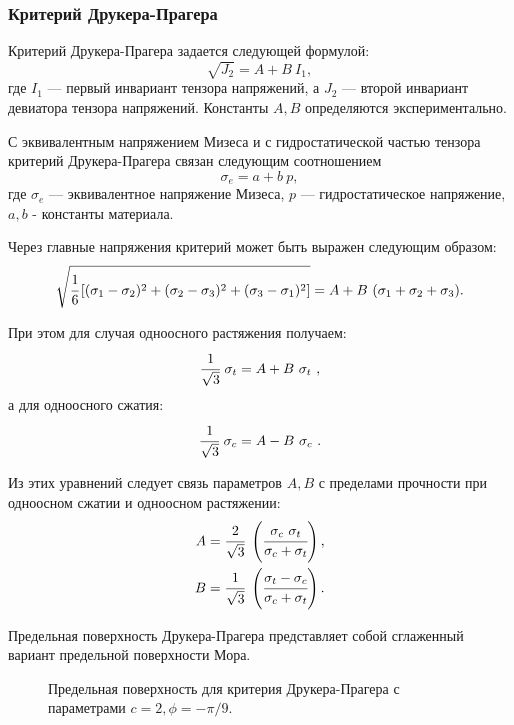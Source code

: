 \subsubsection{Критерий Друкера-Прагера}

Критерий Друкера-Прагера задается следующей формулой:
\begin{equation}
\sqrt{J_2} = A + B~I_1,
\end{equation}
где $I_1$ — первый инвариант тензора напряжений, а $J_2$ — второй инвариант девиатора тензора напряжений. Константы $A, B$ определяются экспериментально.

С эквивалентным напряжением Мизеса и с гидростатической частью тензора критерий Друкера-Прагера связан следующим соотношением
\begin{equation}
\sigma_e = a + b~p,
\end{equation}
где $\sigma_e$ — эквивалентное напряжение Мизеса, $p$ — гидростатическое напряжение, $a,b$ - константы материала.

Через главные напряжения критерий может быть выражен следующим образом:
\begin{equation}
\sqrt{\cfrac{1}{6}\left[(\sigma_1-\sigma_2)^2+(\sigma_2-\sigma_3)^2+(\sigma_3-\sigma_1)^2\right]} = A + B~(\sigma_1+\sigma_2+\sigma_3).
\end{equation}

При этом для случая одноосного растяжения получаем:
\begin{equation}
\cfrac{1}{\sqrt{3}}~\sigma_t = A + B~\sigma_t ~,
\end{equation}
а для одноосного сжатия:
\begin{equation}
\cfrac{1}{\sqrt{3}}~\sigma_c = A - B~\sigma_c ~.
\end{equation}

Из этих уравнений следует связь параметров $A, B$ с пределами прочности при одноосном сжатии и одноосном растяжении:
\begin{align}
A = \cfrac{2}{\sqrt{3}}~\left(\cfrac{\sigma_c~\sigma_t}{\sigma_c+\sigma_t}\right), \nonumber\\
B = \cfrac{1}{\sqrt{3}}~\left(\cfrac{\sigma_t-\sigma_c}{\sigma_c+\sigma_t}\right).
\end{align}

Предельная поверхность Друкера-Прагера представляет собой сглаженный вариант предельной поверхности Мора.

\begin{figure}[h]
\caption{Предельная поверхность для критерия Друкера-Прагера с параметрами $c = 2, \phi = -\pi/9$.}
\end{figure}

